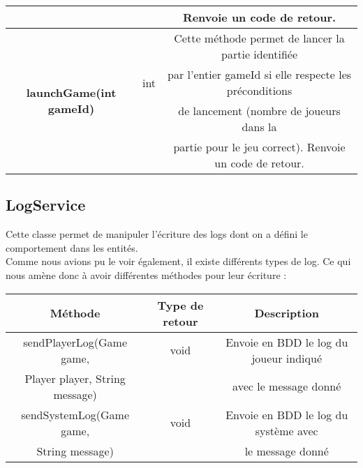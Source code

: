 \documentclass{article}
\begin{document}
\begin{center}
\begin{tabular}{|| c | c | c ||}
                    & & Renvoie un code de retour.\\
                    \hline
                    \multirow{4}{*}{\textbf{launchGame(int gameId)}} & & Cette méthode permet de lancer la partie identifiée \\
                    & int & par l'entier gameId si elle respecte les préconditions \\
                    & & de lancement (nombre de joueurs dans la \\
                    & & partie pour le jeu correct). Renvoie un code de retour.\\
                \hline
                \end{tabular}
            \end{center}

        \subsection{LogService}
            Cette classe permet de manipuler l'écriture des logs dont on a défini le comportement dans les entités.\\
            \indent Comme nous avions pu le voir également, il existe différents types de log. Ce qui nous amène donc à avoir différentes méthodes pour leur écriture :
            \begin{center}
                \begin{tabular}{|| c | c | c ||}
                \hline 
                    Méthode & Type de retour & Description \\
                    \hline
                    \hline
                    sendPlayerLog(Game game, & void & Envoie en BDD le log du joueur indiqué \\
                    Player player, String message) & & avec le message donné \\
                    \hline
                    sendSystemLog(Game game, & void & Envoie en BDD le log du système avec \\
                    String message) & & le message donné \\
                    \hline
                \end{tabular}
            \end{center}
\end{document}
